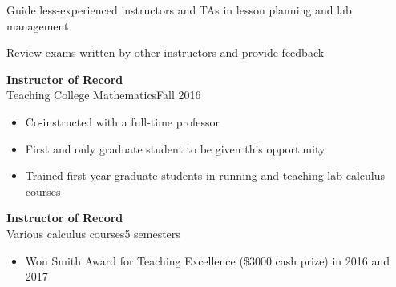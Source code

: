 \documentclass[11pt]{article}
\newcommand{\textsb}[1]{{\fontseries{sb}\selectfont #1}}
\newcommand{\thingleft}[5] {
  {\titlesize \textbf{#1}}\hfill#2\\
  \textsb{#3}\hfill#4

  {\small
    \begin{itemize}
      #5
    \end{itemize}
  }
}
\def\colheight{58.3em}%
\def\leftcolwidth{.375\textwidth}
\newcommand{\titlesize}{\large} %
\begin{document}
{\begin{minipage}[t][\colheight]{\leftcolwidth}
{      \item Guide less-experienced instructors and TAs in lesson planning and
      lab management

      \item Review exams written by other instructors and provide feedback
    }

  \vfill

  \thingleft
    {Instructor of Record}
    {}
    {Teaching College Mathematics}
    {Fall 2016}
    {
      \item Co-instructed with a full-time professor

      \item First and only graduate student to be given this opportunity

      \item Trained first-year graduate students in running and teaching lab
      calculus courses
    }

  \vfill

  \thingleft
    {Instructor of Record}
    {}
    {Various calculus courses}
    {5 semesters}
    {
      \item Won Smith Award for Teaching Excellence (\$3000 cash prize) in 2016
      and 2017
      \vphantom{,p)}
    }

\end{minipage}
} %
%
\hfill
%
%
\end{document}
